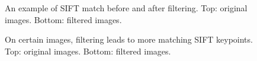 \documentclass[11pt,a4paper]{article}
\begin{document}
\begin{figure}[htbp]
    \centering
    \caption{An example of SIFT match before and after filtering. Top: original images. Bottom: filtered images.}
    \label{fig:filter}
\end{figure}

\begin{figure} [htbp]
    \centering
    \caption{On certain images, filtering leads to more matching SIFT keypoints. Top: original images. Bottom: filtered images.}
    \label{fig:filter_error}
\end{figure}

\clearpage


\end{document}
